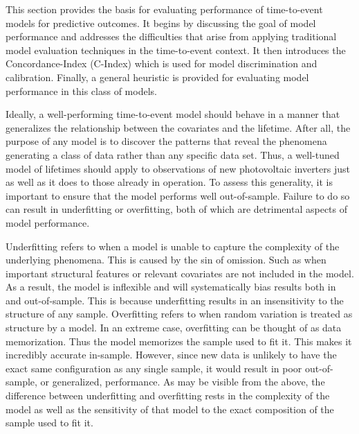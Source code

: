 This section provides the basis for evaluating performance of time-to-event models for predictive outcomes. It begins by discussing the goal of model performance and addresses the difficulties that arise from applying traditional model evaluation techniques in the time-to-event context. It then introduces the Concordance-Index (C-Index) which is used for model discrimination and calibration. Finally, a general heuristic is provided for evaluating model performance in this class of models.

Ideally, a well-performing time-to-event model should behave in a manner that generalizes the relationship between the covariates and the lifetime. After all, the purpose of any model is to discover the patterns that reveal the phenomena generating a class of data rather than any specific data set. Thus, a well-tuned model of lifetimes should apply to observations of new photovoltaic inverters just as well as it does to those already in operation. To assess this generality, it is important to ensure that the model performs well out-of-sample. Failure to do so can result in underfitting or overfitting, both of which are detrimental aspects of model performance. 

Underfitting refers to when a model is unable to capture the complexity of the underlying phenomena. This is caused by the sin of omission. Such as when important structural features or relevant covariates are not included in the model. As a result, the model is inflexible and will systematically bias results both in and out-of-sample. This is because underfitting results in an insensitivity to the structure of any sample. Overfitting refers to when random variation is treated as structure by a model. In an extreme case, overfitting can be thought of as data memorization. Thus the model memorizes the sample used to fit it. This makes it incredibly accurate in-sample. However, since new data is unlikely to have the exact same configuration as any single sample, it would result in poor out-of-sample, or generalized, performance. As may be visible from the above, the difference between underfitting and overfitting rests in the complexity of the model as well as the sensitivity of that model to the exact composition of the sample used to fit it\cite{McElreath2016}. 


